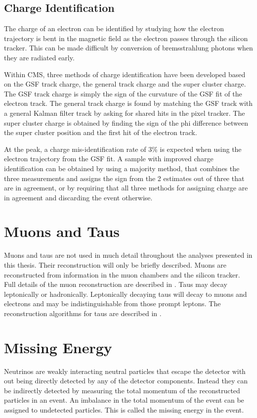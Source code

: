 \subsection{Charge Identification}
\label{sec:charge}
The charge of an electron can be identified by studying how the electron
trajectory is bent in the magnetic field as the electron passes through the
silicon tracker. This can be made difficult by conversion of bremsstrahlung
photons when they are radiated early.

Within CMS, three methods of charge identification have been developed based on
the GSF track charge, the general track charge and the super cluster charge. The
GSF track charge is simply the sign of the curvature of the GSF fit of the
electron track. The general track charge is found by matching the GSF track with
a general Kalman filter track by asking for shared hits in the pixel tracker. 
The super cluster charge is obtained by finding the sign of the phi difference
between the super cluster position and the first hit of the electron track.

At the \PZ peak, a charge mis-identification rate of \unit{3}{\%} \cite{eReco}
is expected when using the electron trajectory from the GSF fit.  A sample with
improved charge identification can be obtained by using a majority method, that
combines the three measurements and assigns the sign from the 2 estimates out of
three that are in agreement, or by requiring that all three methods for
assigning charge are in agreement and discarding the event otherwise.

\section{Muons and Taus}
Muons and taus are not used in much detail throughout the analyses presented in
this thesis. Their reconstruction will only be briefly described. 
Muons are reconstructed from information in the muon chambers and the silicon
tracker.  Full details of the muon reconstruction are described in \cite{}.
Taus may decay leptonically or hadronically. Leptonically decaying taus will
decay to muons and electrons and may be indistinguishable from those prompt
leptons. The reconstruction algorithms for taus are described in \cite{}.

\section{Missing Energy} 
Neutrinos are weakly interacting neutral particles that escape the
detector with out being directly detected by any of the detector components. 
Instead they can be indirectly detected by measuring the total momentum of the
reconstructed particles in an event.
An imbalance in the total momentum of the event can be assigned to undetected
particles. This is called the missing energy in the event.

